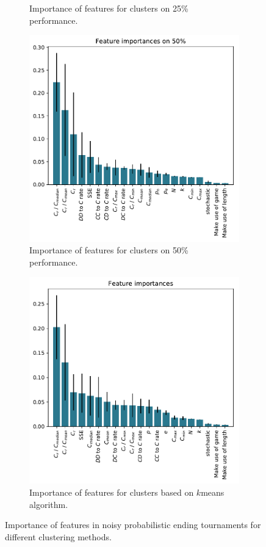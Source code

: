 \documentclass{article}
\begin{document}
\begin{figure}[!htbp]
\begin{subfigure}[t]{0.5\textwidth}
\begin{center}
        \end{center}
        \caption{Importance of features for clusters on 25\% performance.}
    \end{subfigure}
    \begin{subfigure}[t]{0.5\textwidth}
        \begin{center}
            \includegraphics[width=.75\linewidth]{../new_output/probend_noise/_feature_importance_bar_plot_cluster_on_0_5.pdf}
        \end{center}
        \caption{Importance of features for clusters on 50\% performance.}
    \end{subfigure}
    \begin{subfigure}[t]{0.5\textwidth}
        \begin{center}
            \includegraphics[width=.75\linewidth]{../k_means_output/probend_noise/_feature_importance_bar_plot.pdf}
        \end{center}
        \caption{Importance of features for clusters based on \(k\)means algorithm.}
    \end{subfigure}
    \caption{Importance of features in noisy probabilistic ending tournaments for different
    clustering methods.}\label{fig:clustering_importance_probend_noise}
\end{figure}
\end{document}
